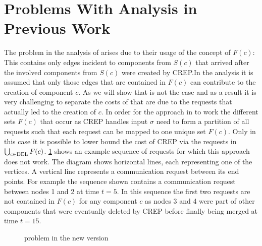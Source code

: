 \documentclass[xcolor=dvipsnames, tikz, 12pt]{article}
\newcommand{\nl}{\newline}
\newcommand{\crep}{C{\scriptsize REP}}
\newcommand{\del}{\text{\scriptsize DEL}}
\newcommand{\opt}{\text{O{\scriptsize PT}}}
\newcommand{\request}[3]{\draw (axis cs:#3,#1) -- node[left]{} (axis cs:#3,#2);}
\theoremstyle{definition}
\begin{document}
	\section{Problems With Analysis in Previous Work}
	\label{flawsSection}
	The problem in the analysis of \cite{Avin2015a} arises due to their usage of the concept of $F(c)$: This contains only edges incident to components from $S(c)$ that arrived after the involved components from $S(c)$ were created by \crep{}.In the analysis it is assumed that only those edges that are contained in $F(c)$ can contribute to the creation of component $c$. As we will show that is not the case and as a result it is very challenging to separate the costs of \opt{} that are due to the requests that actually led to the creation of $c$.\nl
	In order for the approach in \cite{Avin2015a} to work the different sets $F(c)$ that occur as \crep{} handles input $\sigma$ need to form a partition of all requests such that each request can be mapped to one unique set $F(c)$. Only in this case it is possible to lower bound the cost of \crep{} via the requests in $\bigcup_{c\in\del{}}F(c)$.\nl
	\cref{exNewCrep} shows an example sequence of requests for which this approach does not work. The diagram shows horizontal lines, each representing one of the vertices. A vertical line represents a communication request between its end points. For example the sequence shown contains a communication request between nodes 1 and 2 at time $t=5$.\nl
	In this sequence the first two requests are not contained in $F(c)$ for any component $c$ as nodes 3 and 4 were part of other components that were eventually deleted by \crep{} before finally being merged at time $t=15$.\nl
	
	\begin{figure}
		\caption{problem in the new version}\label{exNewCrep}	
	\end{figure}
	
\end{document}
